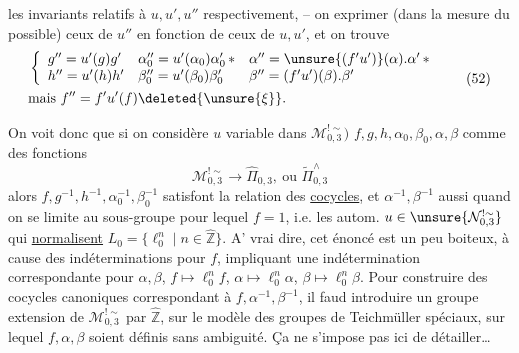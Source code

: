 
les invariants relatifs à $u,u',u''$ respectivement, -- on  exprimer (dans la mesure du possible) ceux de $u''$ en fonction de ceux de $u,u'$, et on trouve
\[
\begin{aligned}
&\left\{\begin{array}{lll}
g''=u'(g)g' & \alpha_0''=u'(\alpha_0)\alpha_0'\, {*} & \alpha''=\unsure{(f'u')}(\alpha).\alpha'\, {*}\\
h''=u'(h)h' & \beta_0''=u'(\beta_0)\beta_0' & \beta''=(f'u')(\beta).\beta'
\end{array}\right.\\
&\text{mais } f''=f'u'(f)\deleted{\unsure{\xi}}.
\end{aligned}
\tag{52}
\]

On voit donc que si on considère  $u$ variable dans $\mathcal M_{0,3}^{!\sim})$ $f,g,h,\alpha_0,\beta_0,\alpha,\beta$ comme des fonctions
\[
\mathcal M_{0,3}^{!\sim}\longrightarrow\widehat{\Pi}_{0,3},\ \text{ou }\widetilde{\Pi}_{0,3}^{\wedge}
\]
alors $f,g^{-1},h^{-1},\alpha_0^{-1},\beta_0^{-1}$ satisfont la relation des \uline{cocycles}, et $\alpha^{-1},\beta^{-1}$ aussi quand on se limite au sous-groupe pour lequel $f=1$, i.e. les autom. $u\in\unsure{\mathcal N_{0,3}^{!\sim}}$ qui \uline{normalisent}  $L_0=\{\ell_0^n\mid n\in\widehat{\mathbb Z}\}$. A' vrai dire, cet énoncé  est un peu boiteux, à cause des indéterminations pour $f$, impliquant une indétermination correspondante pour $\alpha,\beta$, $f\mapsto\ell_0^n f$, $\alpha\mapsto\ell_0^n\alpha$, $\beta\mapsto\ell_0^n\beta$. Pour construire des cocycles canoniques correspondant à $f,\alpha^{-1},\beta^{-1}$, il faud introduire un groupe extension de $\mathcal M_{0,3}^{!\sim}$ par $\widehat{\mathbb Z}$, sur le modèle des groupes de Teichmüller spéciaux, sur lequel $f,\alpha,\beta$ soient définis sans ambiguité. Ça ne s'impose pas ici de détailler\ldots


